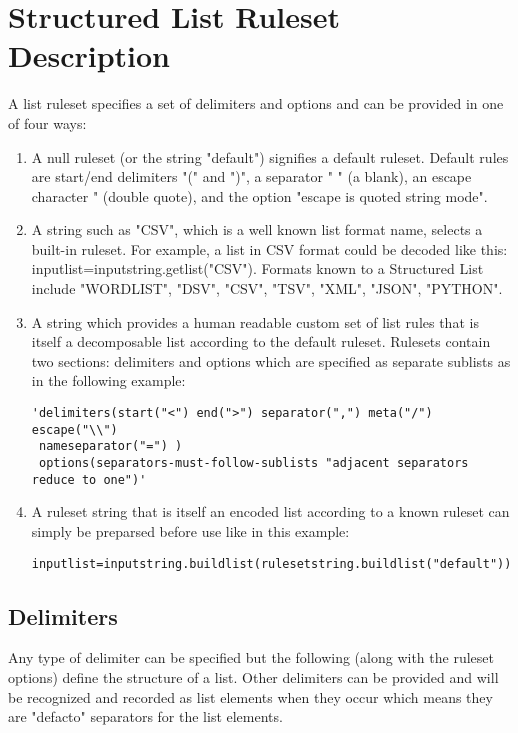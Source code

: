 \section{Structured List Ruleset Description}

A list ruleset specifies a set of delimiters and options and can be provided in one of four ways:
\begin{enumerate}
\item A null ruleset (or the string "default") signifies a default ruleset. Default rules are start/end delimiters "(" and ")", a separator " " (a blank), an escape character " (double quote), and the option "escape is quoted string mode".

\item A string such as "CSV", which is a well known list format name, selects a built-in ruleset. For example, a list in CSV format could be decoded like this: inputlist=inputstring.getlist("CSV"). Formats known to a Structured List include "WORDLIST", "DSV", "CSV", "TSV", "XML", "JSON", "PYTHON".

\item A string which provides a human readable custom set of list rules that is itself a decomposable list according to the default ruleset. Rulesets contain two sections: delimiters and options which are specified as separate sublists as in the following example: \\

\begin{verbatim}
'delimiters(start("<") end(">") separator(",") meta("/") escape("\\")
 nameseparator("=") ) 
 options(separators-must-follow-sublists "adjacent separators reduce to one")'
\end{verbatim}
\item A ruleset string that is itself an encoded list according to a
  known ruleset can simply be preparsed before use like in this
  example: \\
\begin{verbatim}
inputlist=inputstring.buildlist(rulesetstring.buildlist("default"))
\end{verbatim}
\end{enumerate}

\subsection{Delimiters}

Any type of delimiter can be specified but the following (along with the ruleset options) define the structure of a list. Other delimiters can be provided and will be recognized and recorded as list elements when they occur which means they are "defacto" separators for the list elements.

